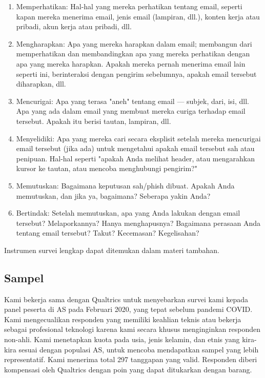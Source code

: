 \documentclass[lettersize,journal]{IEEEtran}
\begin{document}
\begin{enumerate}
  \item{Memperhatikan}: Hal-hal yang mereka perhatikan tentang email, seperti kapan mereka menerima email, jenis email (lampiran, dll.), konten kerja atau pribadi, akun kerja atau pribadi, dll.
  \item{Mengharapkan}: Apa yang mereka harapkan dalam email; membangun dari memperhatikan dan membandingkan apa yang mereka perhatikan dengan apa yang mereka harapkan. Apakah mereka pernah menerima email lain seperti ini, berinteraksi dengan pengirim sebelumnya, apakah email tersebut diharapkan, dll.
  \item{Mencurigai}: Apa yang terasa "aneh" tentang email — subjek, dari, isi, dll. Apa yang ada dalam email yang membuat mereka curiga terhadap email tersebut. Apakah itu berisi tautan, lampiran, dll.
  \item{Menyelidiki}: Apa yang mereka cari secara eksplisit setelah mereka mencurigai email tersebut (jika ada) untuk mengetahui apakah email tersebut sah atau penipuan. Hal-hal seperti "apakah Anda melihat header, atau mengarahkan kursor ke tautan, atau mencoba menghubungi pengirim?"
  \item{Memutuskan}: Bagaimana keputusan sah/phish dibuat. Apakah Anda memutuskan, dan jika ya, bagaimana? Seberapa yakin Anda?
  \item{Bertindak}: Setelah memutuskan, apa yang Anda lakukan dengan email tersebut? Melaporkannya? Hanya menghapusnya? Bagaimana perasaan Anda tentang email tersebut? Takut? Kecemasan? Kegelisahan?
\end{enumerate}

Instrumen survei lengkap dapat ditemukan dalam materi tambahan.

\subsection{Sampel}

Kami bekerja sama dengan Qualtrics untuk menyebarkan survei kami kepada panel
peserta di AS pada Februari 2020, yang tepat sebelum pandemi COVID. Kami
mengecualikan responden yang memiliki keahlian teknis atau bekerja sebagai
profesional teknologi karena kami secara khusus menginginkan responden
non-ahli. Kami menetapkan kuota pada usia, jenis kelamin, dan etnis yang
kira-kira sesuai dengan populasi AS, untuk mencoba mendapatkan sampel yang
lebih representatif. Kami menerima total 297 tanggapan yang valid. Responden
diberi kompensasi oleh Qualtrics dengan poin yang dapat ditukarkan dengan
barang.
\end{document}
